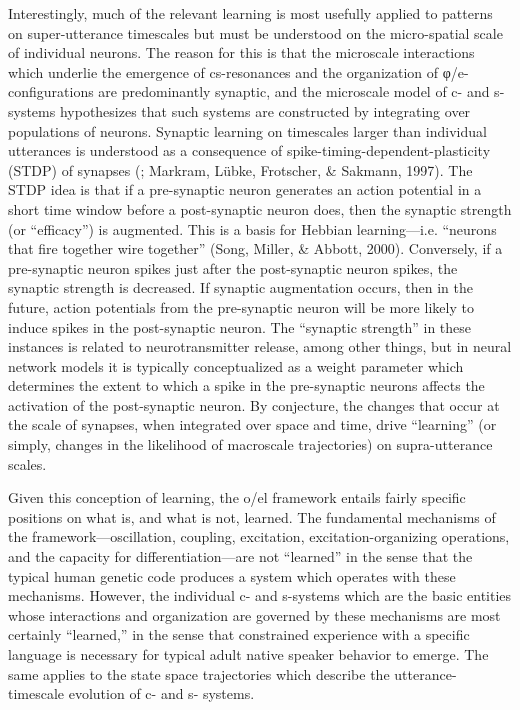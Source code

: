 Interestingly, much of the relevant learning is most usefully applied to patterns on super-utterance timescales but must be understood on the micro-spatial scale of individual neurons. The reason for this is that the microscale interactions which underlie the emergence of cs-resonances and the organization of φ/e-configurations are predominantly synaptic, and the microscale model of c- and s- systems hypothesizes that such systems are constructed by integrating over populations of neurons. Synaptic learning on timescales larger than individual utterances is understood as a consequence of spike-timing-dependent-plasticity (STDP) of synapses (\citealt{AbbottNelson2000}; Markram, Lübke, Frotscher, \& Sakmann, 1997). The STDP idea is that if a pre-synaptic neuron generates an action potential in a short time window before a post-synaptic neuron does, then the synaptic strength (or “efficacy”) is augmented. This is a basis for Hebbian learning—i.e. “neurons that fire together wire together” (Song, Miller, \& Abbott, 2000). Conversely, if a pre-synaptic neuron spikes just after the post-synaptic neuron spikes, the synaptic strength is decreased. If synaptic augmentation occurs, then in the future, action potentials from the pre-synaptic neuron will be more likely to induce spikes in the post-synaptic neuron. The “synaptic strength” in these instances is related to neurotransmitter release, among other things, but in neural network models it is typically conceptualized as a weight parameter which determines the extent to which a spike in the pre-synaptic neurons affects the activation of the post-synaptic neuron. By conjecture, the changes that occur at the scale of synapses, when integrated over space and time, drive “learning” (or simply, changes in the likelihood of macroscale trajectories) on supra-utterance scales. 

  Given this conception of learning, the o/el framework entails fairly specific positions on what is, and what is not, learned. The fundamental mechanisms of the framework—oscillation, coupling, excitation, excitation-organizing operations, and the capacity for differentiation—are not “learned” in the sense that the typical human genetic code produces a system which operates with these mechanisms. However, the individual c- and s-systems which are the basic entities whose interactions and organization are governed by these mechanisms are most certainly “learned,” in the sense that constrained experience with a specific language is necessary for typical adult native speaker behavior to emerge. The same applies to the state space trajectories which describe the utterance-timescale evolution of c- and s- systems.

